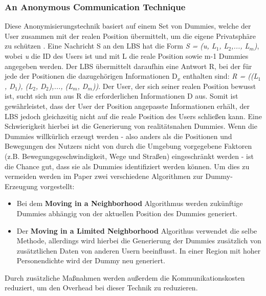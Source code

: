 \subsubsection{An Anonymous Communication Technique}
Diese Anonymisierungstechnik basiert auf einem Set von Dummies, welche der User zusammen mit der realen Position übermittelt, um die eigene Privatsphäre zu schützen \cite{Kido2005}. Eine Nachricht S an den LBS hat die Form \textit{S = (u, L$_{1}$, L$_{2}$,..., L$_{m}$)}, wobei \textit{u} die ID des Users ist und mit L die reale Position sowie m-1 Dummies angegeben werden. Der LBS übermittelt daraufhin eine Antwort R, bei der für jede der Positionen die dazugehörigen Informationen D$_{x}$ enthalten sind: \textit{R = ((L$_{1}$, D$_{1}$), (L$_{2}$, D$_{2}$),..., (L$_{m}$, D$_{m}$))}. Der User, der sich seiner realen Position bewusst ist, sucht sich nun aus R die erforderlichen Informationen D aus. Somit ist gewährleistet, dass der User der Position angepasste Informationen erhält, der LBS jedoch gleichzeitig nicht auf die reale Position des Users schließen kann.
Eine Schwierigkeit hierbei ist die Generierung von realitätsnahen Dummies. Wenn die Dummies willkürlich erzeugt werden - also anders als die Positionen und Bewegungen des Nutzers nicht von durch die Umgebung vorgegebene Faktoren (z.B. Bewegungsgeschwindigkeit, Wege und Straßen) eingeschränkt werden - ist die Chance gut, dass sie als Dummies identifiziert werden können. Um dies zu vermeiden werden im Paper zwei verschiedene Algorithmen zur Dummy-Erzeugung vorgestellt:
\begin{itemize}
	\item Bei dem \textbf{Moving in a Neighborhood} Algorithmus werden zukünftige Dummies abhängig von der aktuellen Position des Dummies generiert.
	\item Der \textbf{Moving in a Limited Neighborhood} Algorithus verwendet die selbe Methode, allerdings wird hierbei die Generierung der Dummies zusätzlich von zusätztlichen Daten von anderen Usern beeinflusst. In einer Region mit hoher Personendichte wird der Dummy neu generiert.
\end{itemize}
Durch zusätzliche Maßnahmen werden außerdem die Kommunikationskosten reduziert, um den Overhead bei dieser Technik zu reduzieren.

